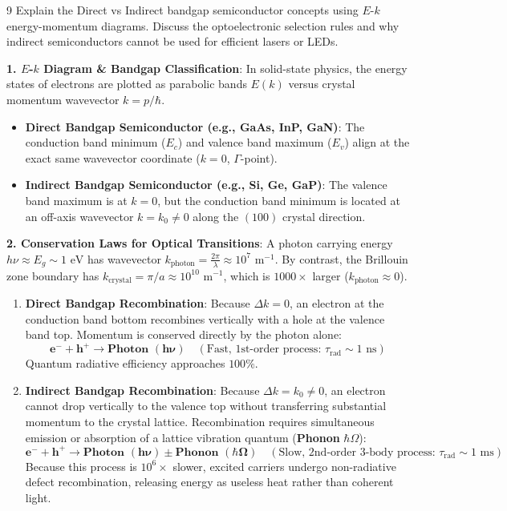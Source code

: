 \begin{theoryq}{9}
Explain the Direct vs Indirect bandgap semiconductor concepts using $E$-$k$ energy-momentum diagrams. Discuss the optoelectronic selection rules and why indirect semiconductors cannot be used for efficient lasers or LEDs.
\end{theoryq}
\begin{theorysol}
\textbf{1. $E$-$k$ Diagram \& Bandgap Classification}:
In solid-state physics, the energy states of electrons are plotted as parabolic bands $E(k)$ versus crystal momentum wavevector $k = p/\hbar$.
\begin{itemize}
    \item \textbf{Direct Bandgap Semiconductor (e.g., GaAs, InP, GaN)}:
    The conduction band minimum ($E_c$) and valence band maximum ($E_v$) align at the exact same wavevector coordinate ($k = 0$, $\Gamma$-point).
    \item \textbf{Indirect Bandgap Semiconductor (e.g., Si, Ge, GaP)}:
    The valence band maximum is at $k = 0$, but the conduction band minimum is located at an off-axis wavevector $k = k_0 \ne 0$ along the $(100)$ crystal direction.
\end{itemize}

\textbf{2. Conservation Laws for Optical Transitions}:
A photon carrying energy $h\nu \approx E_g \sim 1\text{ eV}$ has wavevector $k_{\text{photon}} = \frac{2\pi}{\lambda} \approx 10^7\text{ m}^{-1}$.
By contrast, the Brillouin zone boundary has $k_{\text{crystal}} = \pi/a \approx 10^{10}\text{ m}^{-1}$, which is $1000\times$ larger ($k_{\text{photon}} \approx 0$).

\begin{enumerate}
    \item \textbf{Direct Bandgap Recombination}:
    Because $\Delta k = 0$, an electron at the conduction band bottom recombines vertically with a hole at the valence band top. Momentum is conserved directly by the photon alone:
    \begin{equation}
    \mathbf{e^- + h^+ \to \text{Photon } (h\nu)} \quad (\text{Fast, 1st-order process: } \tau_{\text{rad}} \sim 1\text{ ns})
    \end{equation}
    Quantum radiative efficiency approaches $100\%$.

    \item \textbf{Indirect Bandgap Recombination}:
    Because $\Delta k = k_0 \ne 0$, an electron cannot drop vertically to the valence top without transferring substantial momentum to the crystal lattice.
    Recombination requires simultaneous emission or absorption of a lattice vibration quantum (\textbf{Phonon} $\hbar\Omega$):
    \begin{equation}
    \mathbf{e^- + h^+ \to \text{Photon } (h\nu) \pm \text{Phonon } (\hbar\Omega)} \quad (\text{Slow, 2nd-order 3-body process: } \tau_{\text{rad}} \sim 1\text{ ms})
    \end{equation}
    Because this process is $10^6\times$ slower, excited carriers undergo non-radiative defect recombination, releasing energy as useless heat rather than coherent light.
\end{enumerate}
\end{theorysol}
\vspace{4mm}

